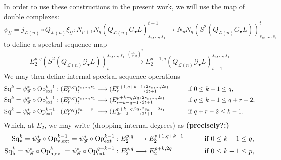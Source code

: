 \documentclass[11pt]{amsart}
\theoremstyle{plain}
\theoremstyle{definition}
\renewcommand{\to}{\longrightarrow}
\newcommand{\scrQ}{\mathscr{Q}}
\newcommand{\scrR}{\mathscr{R}}
\newcommand{\scrT}{\mathscr{T}}
\newcommand{\scrY}{\mathscr{Y}}
\newcommand{\scrI}{\mathscr{I}}
\newcommand{\scrO}{\mathscr{O}}
\newcommand{\scrP}{\mathscr{P}}
\newcommand{\scrS}{\mathscr{S}}
\newcommand{\scrG}{\mathscr{G}}
\newcommand{\scrH}{\mathscr{H}}
\newcommand{\scrJ}{\mathscr{J}}
\newcommand{\scrK}{\mathscr{K}}
\newcommand{\scrL}{\mathscr{L}}
\newcommand{\scrZ}{\mathscr{Z}}
\newcommand{\scrN}{\mathscr{N}}
\newcommand{\scrM}{\mathscr{M}}
\newcommand{\calL}{\mathcal{L}}
\theoremstyle{plain}
\newcommand{\BSW}{{\scrG}}%
\newcommand{\BSWres}{{\scrG_\bullet}}
\newcommand{\ExtCohOp}{\textup{Op}_\textup{ext}}
\newcommand{\vExtCohOp}{\textup{Op}_\textup{v,ext}}
\newcommand{\hExtCohOp}{\textup{Op}_\textup{h,ext}}
\newcommand{\Sq}{\mathrm{Sq}}
\begin{document}
\begin{Composite functor spectral sequences}
In order to use these constructions in the present work, we will use the map of double complexes:
\[\psi_{\BSW}=j_{\calL(n)}\circ Q_{\calL(n)}\xi_\BSW:N_{p+1}N_q(Q_{\calL(n)}G_{\bullet}L)_{s_n,\ldots,s_1}^{t+1}\to N_{p}N_q(S^2(Q_{\calL(n)}G_{\bullet}L))_{s_n,\ldots,s_1}^{t}\]
to define a spectral sequence map
\[E_2^{p,q}(S^2(Q_{\calL(n)}\BSWres L))^{s_n,\ldots,s_1}_t\overset{(\psi_\BSW)^*}{\to} E_2^{p+1,q}(Q_{\calL(n)}\BSWres L)^{s_n,\ldots,s_1}_{t+1}\]
We may then define internal spectral sequence operations
\begin{alignat*}{2}
\Sq^k=\psi_{\BSW}^*\circ\ExtCohOp^{k-1}:(E^{p,q}_r)^{s_n,\ldots,s_1}_t&\to (E^{p+1,q+k-1}_r)^{2s_n,\ldots,2s_1}_{2t+1}&\qquad&\text{if }0\leq k-1 \leq q,\\
\Sq^k=\psi_{\BSW}^*\circ\ExtCohOp^{k-1}:(E^{p,q}_r)^{s_n,\ldots,s_1}_t&\to (E^{p+k-q,2q}_{r+k-q-1})^{2s_n,\ldots,2s_1}_{2t+1}&\qquad&\text{if }q\leq k-1\leq q+r-2,\\
\Sq^k=\psi_{\BSW}^*\circ\ExtCohOp^{k-1}:(E^{p,q}_r)^{s_n,\ldots,s_1}_t&\to (E^{p+k-q,2q}_{2r-2})^{2s_n,\ldots,2s_1}_{2t+1}&\qquad&\text{if }q+r-2\leq k-1.
\end{alignat*}
Which, at $E_2$, we may write (dropping internal degrees) as \textbf{(precisely?:)}
\begin{alignat*}{2}
\Sq^k_\textup{v}=\psi_{\BSW}^*\circ\vExtCohOp^{k-1}=\psi_{\BSW}^*\circ\ExtCohOp^{k-1}:E^{p,q}_2&\to E^{p+1,q+k-1}_2&\qquad&\text{if }0\leq k-1 \leq q,\\
\Sq^k_\textup{h}=\psi_{\BSW}^*\circ\hExtCohOp^{k-1}=\psi_{\BSW}^*\circ\ExtCohOp^{q+k-1}:E^{p,q}_2&\to E^{p+k,2q}_2&\qquad&\text{if }0\leq k-1 \leq p,
\end{alignat*}


\end{Composite functor spectral sequences}
\end{document}
